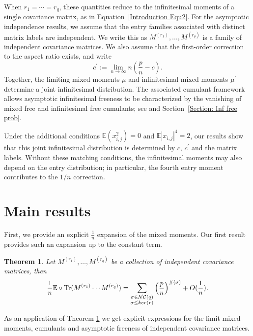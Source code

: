 \documentclass{article}
\newtheorem{theorem}             {Theorem}
\theoremstyle{definition}
\newcommand{\E}{\mathbb{E}}
\newcommand{\NC}{\mathcal{NC}}
\newcommand{\Tr}{\text{Tr}}
\begin{document}
When $r_1=\cdots=r_q$, these quantities reduce to the
infinitesimal moments of a single covariance matrix,
as in Equation~\ref{Introduction Equ2}.
For the asymptotic independence results, we assume that
the entry families associated with distinct matrix labels
are independent. We write this as $M^{(r_1)},\dots, M^{(r_q)}$ is a family of independent covariance matrices. We also assume that the first-order correction to the
aspect ratio exists, and write
\begin{equation}
c^\prime :=
\lim_{n\to\infty}
n\left(\frac{p}{n}-c\right).
\end{equation}
Together, the limiting mixed moments $\mu$ and infinitesimal
mixed moments $\mu^\prime$ determine a joint infinitesimal
distribution.
The associated cumulant framework allows asymptotic
infinitesimal freeness to be characterized by the vanishing
of mixed free and infinitesimal free cumulants; see
\cite{FN10,T23} and
Section~\ref{Section: Inf free prob}.

Under the additional conditions
$\mathbb{E}(x_{i,j}^2)=0$ and
$\mathbb{E}|x_{i,j}|^4=2$, our results show that this
joint infinitesimal distribution is determined by
$c$, $c^\prime$ and the matrix labels.
Without these matching conditions, the infinitesimal
moments may also depend on the entry distribution;
in particular, the fourth entry moment contributes
to the $1/n$ correction.


\section{Main results}

First, we provide an explicit $\frac{1}{n}$ expansion of the mixed moments. Our first result provides such an expansion up to the constant term.

\begin{theorem}\label{Lemma: Expansion of moments 4}
Let $M^{(r_1)},\dots, M^{(r_q)}$ be a collection of independent covariance matrices, then
\begin{equation*}
\frac{1}{n}\E\circ \textup{\Tr}(M^{(r_1)}\cdots M^{(r_q)})=\sum_{\substack{\sigma\in \NC(q) \\ \sigma\leq ker(r)}}\left(\frac{p}{n}\right)^{\#(\sigma)}+O(\frac{1}{n}).
\end{equation*}
\end{theorem}

As an application of Theorem \ref{Lemma: Expansion of moments 4} we get explicit expressions for the limit mixed moments, cumulants and asymptotic freeness of independent covariance matrices.
\end{document}
